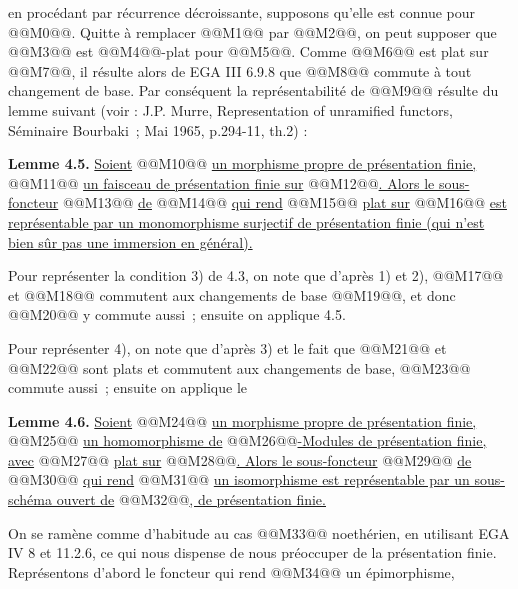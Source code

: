 
en procédant par récurrence décroissante, supposons qu'elle est connue pour @@M0@@. Quitte à remplacer @@M1@@ par @@M2@@, on peut supposer que @@M3@@ est @@M4@@-plat pour @@M5@@. Comme @@M6@@ est plat sur @@M7@@, il résulte alors de EGA III 6.9.8 que @@M8@@ commute à tout changement de base. Par conséquent la représentabilité de @@M9@@ résulte du lemme suivant (voir : J.P. Murre, Representation of unramified functors, Séminaire Bourbaki~; Mai 1965, p.294-11, th.2) :

\textbf{Lemme 4.5.} \uline{Soient} @@M10@@ \uline{un morphisme propre de présentation finie,} @@M11@@ \uline{un faisceau de présentation finie sur} @@M12@@\uline{. Alors le sous-foncteur} @@M13@@ \uline{de} @@M14@@ \uline{qui rend} @@M15@@ \uline{plat sur} @@M16@@ \uline{est représentable par un monomorphisme surjectif de présentation finie (qui n'est bien sûr pas une immersion en général).}

Pour représenter la condition 3) de 4.3, on note que d'après 1) et 2), @@M17@@ et @@M18@@ commutent aux changements de base @@M19@@, et donc @@M20@@ y commute aussi~; ensuite on applique 4.5.

Pour représenter 4), on note que d'après 3) et le fait que @@M21@@ et @@M22@@ sont plats et commutent aux changements de base, @@M23@@ commute aussi~; ensuite on applique le

\textbf{Lemme 4.6.} \uline{Soient} @@M24@@ \uline{un morphisme propre de présentation finie,} @@M25@@ \uline{un homomorphisme de} @@M26@@\uline{-Modules de présentation finie, avec} @@M27@@ \uline{plat sur} @@M28@@\uline{. Alors le sous-foncteur} @@M29@@ \uline{de} @@M30@@ \uline{qui rend} @@M31@@ \uline{un isomorphisme est représentable par un sous-schéma ouvert de} @@M32@@\uline{, de présentation finie.}

On se ramène comme d'habitude au cas @@M33@@ noethérien, en utilisant EGA IV 8 et 11.2.6, ce qui nous dispense de nous préoccuper de la présentation finie. Représentons d'abord le foncteur qui rend @@M34@@ un épimorphisme,
